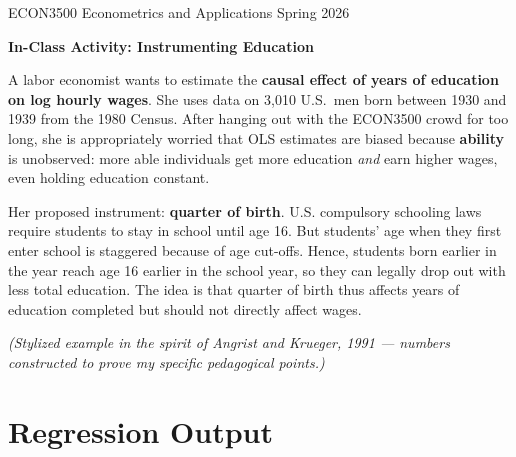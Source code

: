 \documentclass[11pt]{article}
\begin{document}
\thispagestyle{plain}
\singlespacing

ECON3500 Econometrics and Applications \hfill Spring 2026

\begin{center}
\Large{\textbf{In-Class Activity: Instrumenting Education}}\\[2pt]
\end{center}




\vspace{0.6em}

A labor economist wants to estimate the \textbf{causal effect of years of education on log hourly wages}. She uses data on 3{,}010 U.S.\ men born between 1930 and 1939 from the 1980 Census. After hanging out with the ECON3500 crowd for too long, she is appropriately worried that OLS estimates are biased because \textbf{ability} is unobserved: more able individuals get more education \textit{and} earn higher wages, even holding education constant.

Her proposed instrument: \textbf{quarter of birth}. U.S. compulsory schooling laws require students to stay in school until age 16. But students' age when they first enter school is staggered because of age cut-offs. Hence, students born earlier in the year reach age 16 earlier in the school year, so they can legally drop out with less total education. The idea is that quarter of birth thus affects years of education completed but should not directly affect wages.

\textit{(Stylized example in the spirit of Angrist and Krueger, 1991 --- numbers constructed to prove my specific pedagogical points.)}

\section*{Regression Output}
\end{document}

